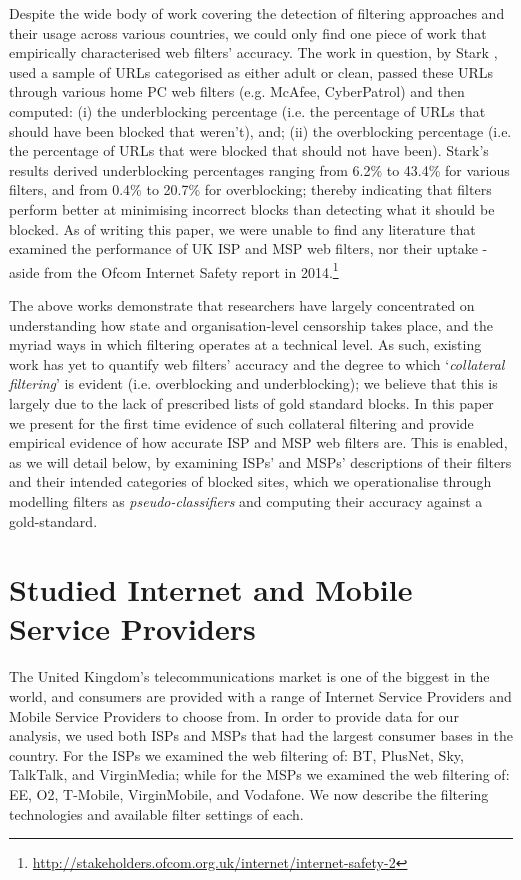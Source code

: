 \documentclass{bmcart}
\begin{document}
Despite the wide body of work covering the detection of filtering approaches and their usage across various countries, we could only find one piece of work that empirically characterised web filters' accuracy.
The work in question, by Stark \cite{stark2007effectiveness}, used a sample of URLs categorised as either adult or clean, passed these URLs through various home PC web filters (e.g. McAfee, CyberPatrol) and then computed: (i) the underblocking percentage (i.e. the percentage of URLs that should have been blocked that weren't), and; (ii) the overblocking percentage (i.e. the percentage of URLs that were blocked that should not have been).
Stark's results derived underblocking percentages ranging from 6.2\% to 43.4\%  for various filters, and from 0.4\% to 20.7\% for overblocking; thereby indicating that filters perform better at minimising incorrect blocks than detecting what it should be blocked.
As of writing this paper, we were unable to find any literature that examined the performance of UK ISP and MSP web filters, nor their uptake - aside from the Ofcom Internet Safety report in 2014.\footnote{\url{http://stakeholders.ofcom.org.uk/internet/internet-safety-2}}

The above works demonstrate that researchers have largely concentrated on understanding how state and organisation-level censorship takes place, and the myriad ways in which filtering operates at a technical level.
As such, existing work has yet to quantify web filters' accuracy and the degree to which `\textit{collateral filtering}' is evident (i.e. overblocking and underblocking); we believe that this is largely due to the lack of prescribed lists of gold standard blocks.
In this paper we present for the first time evidence of such collateral filtering and provide empirical evidence of how accurate ISP and MSP web filters are.
This is enabled, as we will detail below, by examining ISPs' and MSPs' descriptions of their filters and their intended categories of blocked sites, which we operationalise through modelling filters as \textit{pseudo-classifiers} and computing their accuracy against a gold-standard.


\section*{Studied Internet and Mobile Service Providers}
The United Kingdom's telecommunications market is one of the biggest in the world, and consumers are provided with a range of Internet Service Providers and Mobile Service Providers to choose from.
In order to provide data for our analysis, we used both ISPs and MSPs that had the largest consumer bases in the country.
For the ISPs we examined the web filtering of: BT, PlusNet, Sky, TalkTalk, and VirginMedia; while for the MSPs we examined the web filtering of: EE, O2, T-Mobile, VirginMobile, and Vodafone.
We now describe the filtering technologies and available filter settings of each.
\end{document}
